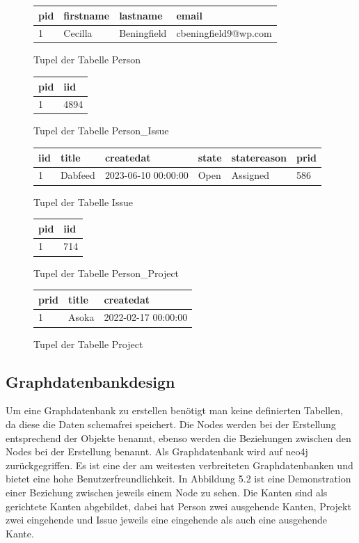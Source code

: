 \begin{figure}[H]
	\centering
	\begin{tabular}{|l | l | l | l |}
	\hline
	pid & firstname & lastname & email \\
	\hline
	1 & Cecilla & Beningfield & cbeningfield9@wp.com \\
	\hline
	\end{tabular}
	\caption{Tupel der Tabelle Person}
\end{figure}
\begin{figure}[H]
	\centering
	\begin{tabular}{|l | l |}
	\hline
	pid & iid \\
	\hline
	1 & 4894 \\
	\hline
	\end{tabular}
	\caption{Tupel der Tabelle Person\_Issue}
\end{figure}
\begin{figure}[H]
	\centering
	\begin{tabular}{|l | l | l | l | l | l|}
	\hline
	iid & title & createdat & state & statereason & prid \\
	\hline
	1 & Dabfeed & 2023-06-10 00:00:00 & Open & Assigned & 586 \\
	\hline
	\end{tabular}
	\caption{Tupel der Tabelle Issue}
\end{figure}
\begin{figure}[H]
	\centering
	\begin{tabular}{|l | l |}
	\hline
	pid & iid \\
	\hline
	1 & 714 \\
	\hline
	\end{tabular}
	\caption{Tupel der Tabelle Person\_Project}
\end{figure}
\begin{figure}[H]
	\centering
	\begin{tabular}{|l | l | l |}
	\hline
	prid & title & createdat \\
	\hline
	1 & Asoka & 2022-02-17 00:00:00 \\
	\hline
	\end{tabular}
	\caption{Tupel der Tabelle Project}
\end{figure}


\subsection{Graphdatenbankdesign} %
\label{sec:graphsdatenbankdesign}
Um eine Graphdatenbank zu erstellen benötigt man keine definierten Tabellen, da diese die Daten schemafrei speichert. Die Nodes werden bei der Erstellung entsprechend der Objekte benannt, ebenso werden die Beziehungen zwischen den Nodes bei der Erstellung benannt. Als Graphdatenbank wird auf neo4j zurückgegriffen. Es ist eine der am weitesten verbreiteten Graphdatenbanken und bietet eine hohe Benutzerfreundlichkeit. In Abbildung 5.2 ist eine Demonstration einer Beziehung zwischen jeweils einem Node zu sehen. Die Kanten sind als gerichtete Kanten abgebildet, dabei hat Person zwei ausgehende Kanten, Projekt zwei eingehende und Issue jeweils eine eingehende als auch eine ausgehende Kante. 


